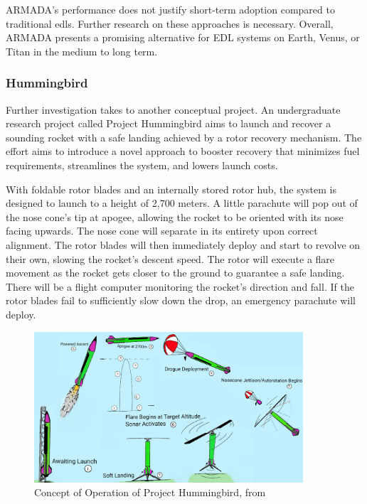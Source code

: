 ARMADA's \cite{noauthor_armada_nodate} performance does not justify short-term adoption compared to traditional \gls{edls}. Further research on these approaches is necessary. Overall, ARMADA presents a promising alternative for EDL systems on Earth, Venus, or Titan in the medium to long term.



\subsubsection{Hummingbird}

Further investigation takes to another conceptual project. An undergraduate research project called Project Hummingbird \cite{maurer_project_nodate} aims to launch and recover a sounding rocket with a safe landing achieved by a rotor recovery mechanism. The effort aims to introduce a novel approach to booster recovery that minimizes fuel requirements, streamlines the system, and lowers launch costs.

With foldable rotor blades and an internally stored rotor hub, the system is designed to launch to a height of 2,700 meters. A little parachute will pop out of the nose cone's tip at apogee, allowing the rocket to be oriented with its nose facing upwards. The nose cone will separate in its entirety upon correct alignment. The rotor blades will then immediately deploy and start to revolve on their own, slowing the rocket's descent speed. The rotor will execute a flare movement as the rocket gets closer to the ground to guarantee a safe landing. There will be a flight computer monitoring the rocket's direction and fall. If the rotor blades fail to sufficiently slow down the drop, an emergency parachute will deploy.

\begin{figure}[!htb]
    \centering
    \includegraphics[width=10cm]{Figures/introduction/Hummingbird_operation.png}
    \caption{Concept of Operation of Project Hummingbird, from \cite{maurer_project_nodate}}
    \label{fig:Hummingbird_operation}
\end{figure}

